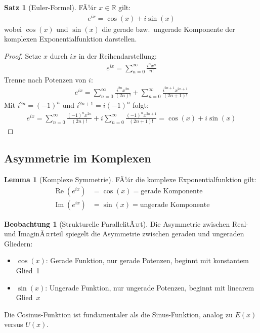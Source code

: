 ﻿\documentclass[a4paper,12pt]{article}
\theoremstyle{definition}
\newtheorem{satz}{Satz}
\newtheorem{lemma}{Lemma}
\newtheorem{beobachtung}{Beobachtung}
\begin{document}
\begin{satz}[Euler-Formel]
FÃ¼r $x \in \mathbb{R}$ gilt:
\begin{align}
  e^{ix} = \cos(x) + i\sin(x)
\end{align}
wobei $\cos(x)$ und $\sin(x)$ die gerade bzw.\ ungerade Komponente der
komplexen Exponentialfunktion darstellen.
\end{satz}

\begin{proof}
Setze $x$ durch $ix$ in der Reihendarstellung:
\begin{align}
  e^{ix} = \sum_{n=0}^{\infty} \frac{i^n x^n}{n!}
\end{align}
Trenne nach Potenzen von $i$:
\begin{align}
  e^{ix} = \sum_{n=0}^{\infty} \frac{i^{2n} x^{2n}}{(2n)!}
          + \sum_{n=0}^{\infty} \frac{i^{2n+1} x^{2n+1}}{(2n+1)!}
\end{align}
Mit $i^{2n} = (-1)^n$ und $i^{2n+1} = i(-1)^n$ folgt:
\begin{align}
  e^{ix} = \sum_{n=0}^{\infty} \frac{(-1)^n x^{2n}}{(2n)!}
          + i \sum_{n=0}^{\infty} \frac{(-1)^n x^{2n+1}}{(2n+1)!}
         = \cos(x) + i\sin(x)
\end{align}
\end{proof}

\subsection{Asymmetrie im Komplexen}

\begin{lemma}[Komplexe Symmetrie]
FÃ¼r die komplexe Exponentialfunktion gilt:
\begin{align}
  \operatorname{Re}(e^{ix}) &= \cos(x) = \text{gerade Komponente} \\
  \operatorname{Im}(e^{ix}) &= \sin(x) = \text{ungerade Komponente}
\end{align}
\end{lemma}

\begin{beobachtung}[Strukturelle ParallelitÃ¤t]
Die Asymmetrie zwischen Real- und ImaginÃ¤rteil spiegelt die Asymmetrie
zwischen geraden und ungeraden Gliedern:
\begin{itemize}
  \item[-] $\cos(x)$: Gerade Funktion, nur gerade Potenzen, beginnt mit
           konstantem Glied~1
  \item[-] $\sin(x)$: Ungerade Funktion, nur ungerade Potenzen, beginnt mit
           linearem Glied~$x$
\end{itemize}
Die Cosinus-Funktion ist fundamentaler als die Sinus-Funktion, analog zu
$E(x)$ versus $U(x)$.
\end{beobachtung}
\end{document}
